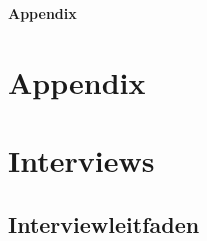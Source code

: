 
\appendix
\thispagestyle{empty}
\begingroup
\fontsize{30pt}{40pt}\selectfont
\begin{center}
    {\bfseries Appendix}
\end{center}
\endgroup
\restoregeometry
\newpage
\section[Appendix]{Appendix}
\section{Interviews}
\label{appendix:interviews}

\subsection{Interviewleitfaden}
\label{appendix:interviewleitfaden}

\newpage